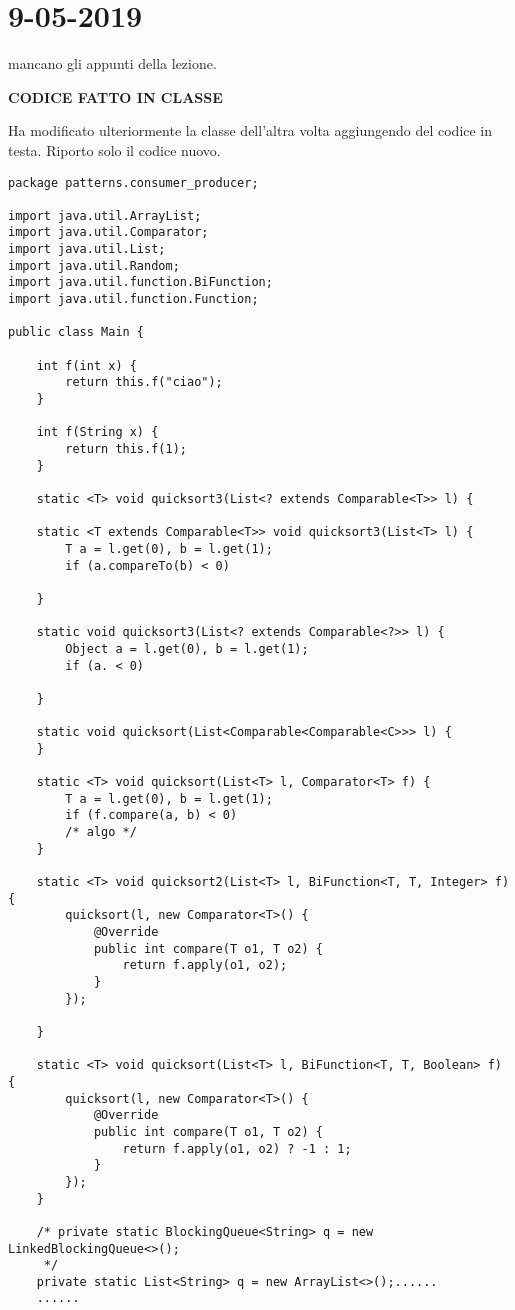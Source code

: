 

\newpage
\section{9-05-2019}
\noindent mancano gli appunti della lezione.


\noindent \textbf{CODICE FATTO IN CLASSE} \newline

\noindent Ha modificato ulteriormente la classe dell'altra volta aggiungendo del codice in testa. Riporto solo il codice nuovo.
 
\begin{lstlisting}
package patterns.consumer_producer;

import java.util.ArrayList;
import java.util.Comparator;
import java.util.List;
import java.util.Random;
import java.util.function.BiFunction;
import java.util.function.Function;

public class Main {

    int f(int x) {
        return this.f("ciao");
    }

    int f(String x) {
        return this.f(1);
    }

    static <T> void quicksort3(List<? extends Comparable<T>> l) {

    static <T extends Comparable<T>> void quicksort3(List<T> l) {
        T a = l.get(0), b = l.get(1);
        if (a.compareTo(b) < 0)

    }

    static void quicksort3(List<? extends Comparable<?>> l) {
        Object a = l.get(0), b = l.get(1);
        if (a. < 0)

    }

    static void quicksort(List<Comparable<Comparable<C>>> l) {
    }

    static <T> void quicksort(List<T> l, Comparator<T> f) {
        T a = l.get(0), b = l.get(1);
        if (f.compare(a, b) < 0)
        /* algo */
    }

    static <T> void quicksort2(List<T> l, BiFunction<T, T, Integer> f) {
        quicksort(l, new Comparator<T>() {
            @Override
            public int compare(T o1, T o2) {
                return f.apply(o1, o2);
            }
        });

    }

    static <T> void quicksort(List<T> l, BiFunction<T, T, Boolean> f) {
        quicksort(l, new Comparator<T>() {
            @Override
            public int compare(T o1, T o2) {
                return f.apply(o1, o2) ? -1 : 1;
            }
        });
    }

    /* private static BlockingQueue<String> q = new LinkedBlockingQueue<>();
     */
    private static List<String> q = new ArrayList<>();......
    ......    
\end{lstlisting}